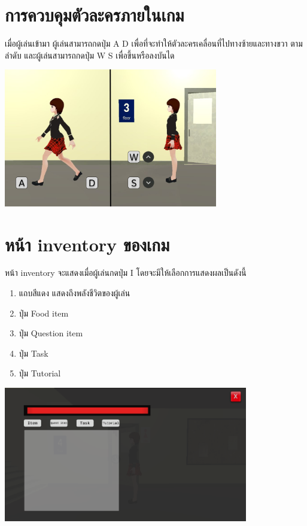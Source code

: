\section*{การควบคุมตัวละครภายในเกม}
เมื่อผู้เล่นเข้ามา ผู้เล่นสามารถกดปุ่ม A D เพื่อที่จะทำให้ตัวละครเคลื่อนที่ไปทางซ้ายและทางขวา ตามลำดับ และผู้เล่นสามารถกดปุ่ม W S เพื่อขึ้นหรือลงบันได
\begin{center}
    \includegraphics[width=0.7\textwidth, height=0.25\textheight]{Images/tutorial_move.png}
\end{center}

\section*{หน้า inventory ของเกม}
หน้า inventory จะแสดงเมื่อผู้เล่นกดปุ่ม I โดยจะมีให้เลือกการแสดงผลเป็นดังนี้
\begin{enumerate}
    \item แถบสีแดง แสดงถึงพลังชีวิตของผู้เล่น
    \item ปุ่ม Food item
    \item ปุ่ม Question item
    \item ปุ่ม Task
    \item ปุ่ม Tutorial
\end{enumerate}
\begin{center}
    \includegraphics[width=0.8\textwidth, height=0.25\textheight]{Images/Inventory Image.png}
\end{center}
